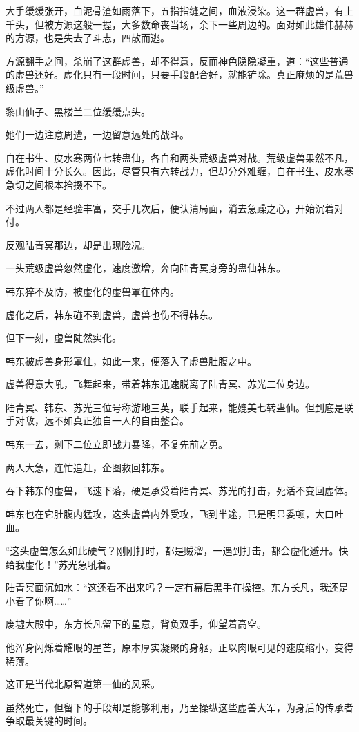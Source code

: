 \begin{this_body}
大手缓缓张开，血泥骨渣如雨落下，五指指缝之间，血液浸染。这一群虚兽，有上千头，但被方源这般一握，大多数命丧当场，余下一些周边的。面对如此雄伟赫赫的方源，也是失去了斗志，四散而逃。

方源翻手之间，杀崩了这群虚兽，却不得意，反而神色隐隐凝重，道：“这些普通的虚兽还好。虚化只有一段时间，只要手段配合好，就能铲除。真正麻烦的是荒兽级虚兽。”

黎山仙子、黑楼兰二位缓缓点头。

她们一边注意周遭，一边留意远处的战斗。

自在书生、皮水寒两位七转蛊仙，各自和两头荒级虚兽对战。荒级虚兽果然不凡，虚化时间十分长久。因此，尽管只有六转战力，但却分外难缠，自在书生、皮水寒急切之间根本拾掇不下。

不过两人都是经验丰富，交手几次后，便认清局面，消去急躁之心，开始沉着对付。

反观陆青冥那边，却是出现险况。

一头荒级虚兽忽然虚化，速度激增，奔向陆青冥身旁的蛊仙韩东。

韩东猝不及防，被虚化的虚兽罩在体内。

虚化之后，韩东碰不到虚兽，虚兽也伤不得韩东。

但下一刻，虚兽陡然实化。

韩东被虚兽身形罩住，如此一来，便落入了虚兽肚腹之中。

虚兽得意大吼，飞舞起来，带着韩东迅速脱离了陆青冥、苏光二位身边。

陆青冥、韩东、苏光三位号称游地三英，联手起来，能媲美七转蛊仙。但到底是联手对敌，远不如真正独自一人的自由整合。

韩东一去，剩下二位立即战力暴降，不复先前之勇。

两人大急，连忙追赶，企图救回韩东。

吞下韩东的虚兽，飞速下落，硬是承受着陆青冥、苏光的打击，死活不变回虚体。

韩东也在它肚腹内猛攻，这头虚兽内外受攻，飞到半途，已是明显委顿，大口吐血。

“这头虚兽怎么如此硬气？刚刚打时，都是贼溜，一遇到打击，都会虚化避开。快给我虚化！”苏光急吼着。

陆青冥面沉如水：“这还看不出来吗？一定有幕后黑手在操控。东方长凡，我还是小看了你啊……”

废墟大殿中，东方长凡留下的星意，背负双手，仰望着高空。

他浑身闪烁着耀眼的星芒，原本厚实凝聚的身躯，正以肉眼可见的速度缩小，变得稀薄。

这正是当代北原智道第一仙的风采。

虽然死亡，但留下的手段却是能够利用，乃至操纵这些虚兽大军，为身后的传承者争取最关键的时间。


\end{this_body}
